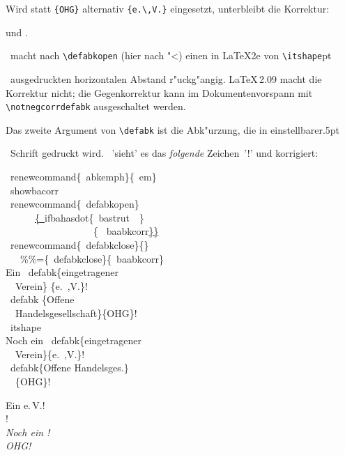 \documentclass[12pt,a4paper]{article}
\newcommand{\pdfko}[1]{\kern #1pt
                          \strut\ignorespaces}%
\newcommand{\pbs}{\string\ \unskip}
\newcommand{\bs}{\protect\pbs}
\begin{document}
\noindent
Wird statt \verb|{OHG}| alternativ \verb|{e.\,V.}| eingesetzt, unterbleibt die 
Korrektur:

\vspace{.5ex}
{\small\renewcommand{\abkemph}{\itshape}\showbacorr 
{\renewcommand{\abkdefopen} {\baabkcorr\ [}%
 \renewcommand{\abkdefclose}{]}%
  } und
{\renewcommand{\defabkopen}{\bastrut\ "<\baabkcorr}%
 \renewcommand{\defabkclose}{\baabkcorr ">}%
  .}
}



\vspace{1ex}\noindent
\BibArts\ macht nach \verb|\defabkopen| (hier nach "<) 
einen in \LaTeX2e von \verb|\itshape|\pdfko{1}\ 
ausgedruckten horizontalen 
Abstand r"uckg"angig. \LaTeX\,2.09 macht die Korrektur nicht;
die \BibArts\hy Gegenkorrektur kann im Dokumentenvorspann mit 
\verb|\notnegcorrdefabk| ausgeschaltet werden.  


\vspace{1ex}\noindent
Das zweite Argument von \verb|\defabk| ist die
Abk"urzung, die in einstellbarer\pdfko{.5}\ 
Schrift gedruckt wird. 
\BibArts\ 'sieht' es das \textit{folgende} Zeichen~'!' und korrigiert:


\Doppelbox
{
    \bs renewcommand\{\bs abkemph\}\{\bs em\} 
 \\[.5ex] \bs showbacorr
 \\[.5ex] \bs renewcommand\{\bs defabkopen\}
 \\ \ \ \ \ \ \ \underline{\{\bs}ifbahasdot\{\bs bastrut\bs\ \}
 \\ \ \ \ \ \ \ \ \ \ \ \ \ \ \ \ \ \ \ \{ \bs baabkcorr\underline{\}\}}
 \\[.5ex] \bs renewcommand\{\bs defabkclose\}\{\}
 \\ \ \ \ \%\%=\{\bs defabkclose\}\{\bs baabkcorr\}
\\[2.5ex]
 Ein \bs defabk\{eingetragener 
\\ \ \ Verein\} \{e.\bs,V.\}!
\\[1.5ex]
 \bs defabk \{Offene 
\\ \ \ Handelsgesellschaft\}\{OHG\}!
\\[1.5ex]
   \bs itshape 
\\[.5ex] Noch ein \bs defabk\{eingetragener 
\\ \ \ Verein\}\{e.\bs,V.\}!
\\[1.5ex]
 \bs defabk\{Offene Handelsges.\}
\\ \ \ \{OHG\}!
}
{
 \vspace{19.4ex}
 \renewcommand{\abkemph}{\em} 
 \showbacorr
 \renewcommand{\defabkopen}
  {\ifbahasdot{\bastrut\ }
           { \baabkcorr}}
 \renewcommand{\defabkclose}{}   %

 Ein  {e.\,V.}!
 \\[3.5ex]
 !
 \\[6.6ex]
   \itshape 
 Noch ein !
 \\[3.6ex]
  {OHG}!
}\label{abkB}
\end{document}
